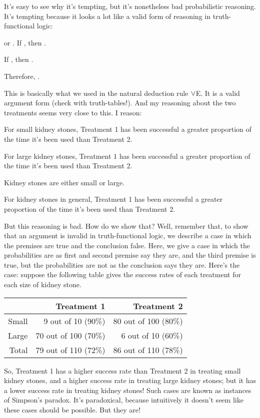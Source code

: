 It's easy to see why it's tempting, but it's nonetheless bad probabilistic reasoning. It's tempting because it looks a lot like a valid form of reasoning in truth-functional logic: 
\begin{earg}
\prem \metaX or \metaY.
\prem If \metaX, then \metaZ.

\prem If \metaY, then \metaZ.

\conc Therefore, \metaZ.
\end{earg}
This is basically what we used in the natural deduction rule $\vee$E. It is a valid argument form (check with truth-tables!). And my reasoning about the two treatments seems very close to this. I reason:
\begin{earg}
\prem For small kidney stones, Treatment 1 has been successful a greater proportion of the time it's been used than Treatment 2.

\prem For large kidney stones, Treatment 1 has been successful a greater proportion of the time it's been used than Treatment 2.

\prem Kidney stones are either small or large.

\conc For kidney stones in general, Treatment 1 has been successful a greater proportion of the time it's been used than Treatment 2.
\end{earg}
But this reasoning is bad. How do we show that? Well, remember that, to show that an argument is invalid in truth-functional logic, we describe a case in which the premises are true and the conclusion false. Here, we give a case in which the probabilities are as first and second premise say they are, and the third premise is true, but the probabilities are not as the conclusion says they are. Here's the case: suppose the following table gives the success rates of each treatment for each size of kidney stone.
\begin{center}
\begin{tabular}{r|r|r}
& Treatment 1 & Treatment 2 \\
\hline 
Small & 9 out of 10 (90\%) & 80 out of 100 (80\%) \\
Large & 70 out of 100 (70\%) & 6 out of 10 (60\%) \\
\hline 
Total & 79 out of 110 (72\%) & 86 out of 110 (78\%) 
\end{tabular}
\end{center}
So, Treatment 1 has a higher success rate than Treatment 2 in treating small kidney stones, and a higher success rate in treating large kidney stones; but it has a lower success rate in treating kidney stones! Such cases are known as instances of Simpson's paradox. It's paradoxical, because intuitively it doesn't seem like these cases should be possible. But they are!

